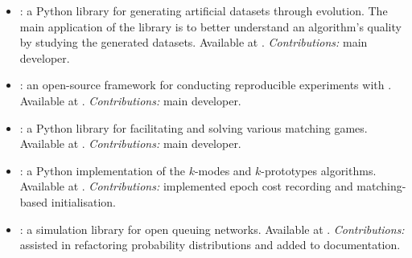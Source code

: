 \begin{itemize}
    \item \edo: a Python library for generating artificial datasets through
        evolution. The main application of the library is to better understand
        an algorithm's quality by studying the generated datasets. Available
        at . \emph{Contributions:} main developer.
    \item \edolab: an open-source framework for conducting reproducible
        experiments with \edo. Available at .
        \emph{Contributions:} main developer.
    \item \matching: a Python library for facilitating and solving various
        matching games. Available at .
        \emph{Contributions:} main developer.
    \item \kmodes: a Python implementation of the \(k\)-modes and
        \(k\)-prototypes algorithms. Available at .
        \emph{Contributions:} implemented epoch cost recording and matching-based
        initialisation.
    \item \ciw: a simulation library for open queuing networks. Available at
        . \emph{Contributions:} assisted in refactoring
        probability distributions and added to documentation.
\end{itemize}
